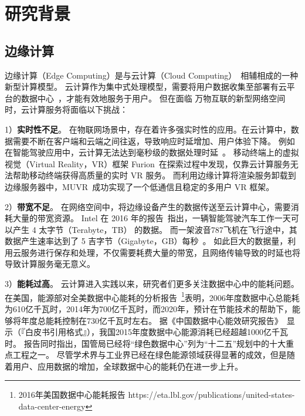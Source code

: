 
\section{研究背景}

\subsection{边缘计算}
边缘计算（Edge Computing）是与云计算（Cloud Computing）~\cite{DBLP:journals/cacm/ArmbrustFGJKKLPRSZ10}相辅相成的一种新型计算模型。
云计算作为集中式处理模型，需要将用户数据收集至部署有云平台的数据中心~\cite{DBLP:conf/icdcs/Montresor16}，才能有效地服务于用户。
但在面临 万物互联的新型网络空间时，云计算服务将面临以下挑战：

1）\textbf{实时性不足}。
在物联网场景中，存在着许多强实时性的应用。在云计算中，数据需要不断在客户端和云端之间往返，导致响应时延增加、用户体验下降。
例如在智能驾驶应用中，云计算无法达到毫秒级的数据处理时延~\cite{DBLP:conf/cvpr/GeigerLU12}。
移动终端上的虚拟视觉（Virtual Reality，VR）框架 Furion~\cite{DBLP:conf/mobicom/LaiHCSD17}在探索过程中发现，仅靠云计算服务无法帮助移动终端获得高质量的实时 VR 服务。
而利用边缘计算将渲染服务卸载到边缘服务器中，MUVR~\cite{DBLP:conf/edge/LiG18}成功实现了一个低通信且稳定的多用户 VR 框架。

2）\textbf{带宽不足}。
在网络空间中，将边缘设备产生的数据传送至云计算中心，需要消耗大量的带宽资源。
Intel 在 2016 年的报告~\cite{DBLP:journals/micro/KatoTINTH15}指出，一辆智能驾驶汽车工作一天可以产生 4 太字节（Terabyte，TB） 的数据。
而一架波音787飞机在飞行途中，其数据产生速率达到了 5 吉字节（Gigabyte，GB）每秒~\cite{JCRD/shi17}。
如此巨大的数据量，利用云服务进行保存和处理，不仅需要耗费大量的带宽，且网络传输导致的时延也将导致计算服务毫无意义。

3）\textbf{能耗过高}。
云计算进入实践以来，研究者们更多关注数据中心中的能耗问题。
在美国，能源部对全美数据中心能耗的分析报告~\footnote{2016年美国数据中心能耗报告 https://eta.lbl.gov/publications/united-states-data-center-energy}表明，2006年度数据中心总能耗为610亿千瓦时，2014年为700亿千瓦时，而2020年，预计在节能技术的帮助下，能够将年度总能耗控制在730亿千瓦时左右。
据《中国数据中心能效研究报告》~\cite{whitebooks/cn15}显示（『白皮书引用格式』），我国2015年度数据中心能源消耗已经超越1000亿千瓦时。
报告同时指出，国管局已经将“绿色数据中心”列为“十二五”规划中的十大重点工程之一。
尽管学术界与工业界已经在绿色能源领域获得显著的成效，但是随着用户、应用数据的增加，全球数据中心的能耗仍在进一步上升。

